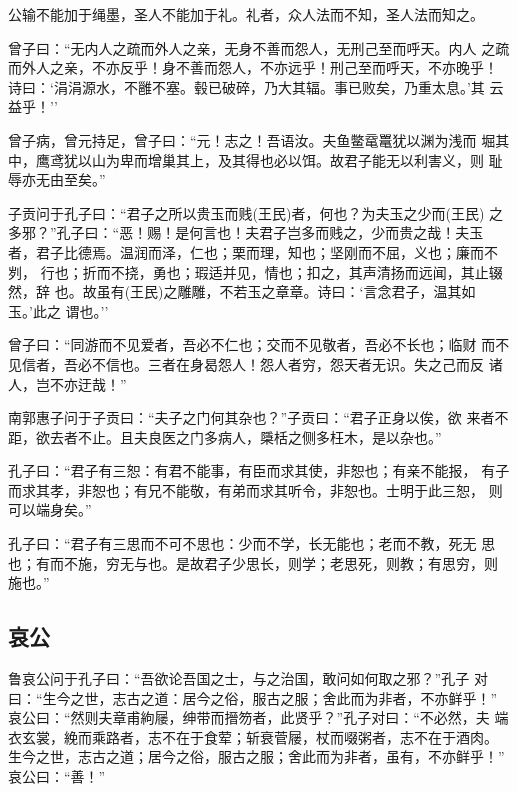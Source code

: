 \documentclass[]{article}
\begin{document}
公输不能加于绳墨，圣人不能加于礼。礼者，众人法而不知，圣人法而知之。

曾子曰：``无内人之疏而外人之亲，无身不善而怨人，无刑己至而呼天。内人
之疏而外人之亲，不亦反乎！身不善而怨人，不亦远乎！刑己至而呼天，不亦晚乎！
诗曰：`涓涓源水，不雝不塞。毂已破碎，乃大其辐。事已败矣，乃重太息。'其
云益乎！''

曾子病，曾元持足，曾子曰：``元！志之！吾语汝。夫鱼鳖鼋鼍犹以渊为浅而
堀其中，鹰鸢犹以山为卑而增巢其上，及其得也必以饵。故君子能无以利害义，则
耻辱亦无由至矣。''

子贡问于孔子曰：``君子之所以贵玉而贱(王民)者，何也？为夫玉之少而(王民)
之多邪？''孔子曰：``恶！赐！是何言也！夫君子岂多而贱之，少而贵之哉！夫玉
者，君子比德焉。温润而泽，仁也；栗而理，知也；坚刚而不屈，义也；廉而不刿，
行也；折而不挠，勇也；瑕适并见，情也；扣之，其声清扬而远闻，其止辍然，辞
也。故虽有(王民)之雕雕，不若玉之章章。诗曰：`言念君子，温其如玉。'此之
谓也。''

曾子曰：``同游而不见爱者，吾必不仁也；交而不见敬者，吾必不长也；临财
而不见信者，吾必不信也。三者在身曷怨人！怨人者穷，怨天者无识。失之己而反
诸人，岂不亦迂哉！''

南郭惠子问于子贡曰：``夫子之门何其杂也？''子贡曰：``君子正身以俟，欲
来者不距，欲去者不止。且夫良医之门多病人，檃栝之侧多枉木，是以杂也。''

孔子曰：``君子有三恕：有君不能事，有臣而求其使，非恕也；有亲不能报，
有子而求其孝，非恕也；有兄不能敬，有弟而求其听令，非恕也。士明于此三恕，
则可以端身矣。''

孔子曰：``君子有三思而不可不思也：少而不学，长无能也；老而不教，死无
思也；有而不施，穷无与也。是故君子少思长，则学；老思死，则教；有思穷，则
施也。''

\hypertarget{header-n132}{%
\subsection{哀公}\label{header-n132}}

鲁哀公问于孔子曰：``吾欲论吾国之士，与之治国，敢问如何取之邪？''孔子
对曰：``生今之世，志古之道：居今之俗，服古之服；舍此而为非者，不亦鲜乎！''
哀公曰：``然则夫章甫絇屦，绅带而搢笏者，此贤乎？''孔子对曰：``不必然，夫
端衣玄裳，絻而乘路者，志不在于食荤；斩衰菅屦，杖而啜粥者，志不在于酒肉。
生今之世，志古之道；居今之俗，服古之服；舍此而为非者，虽有，不亦鲜乎！''
哀公曰：``善！''
\end{document}
